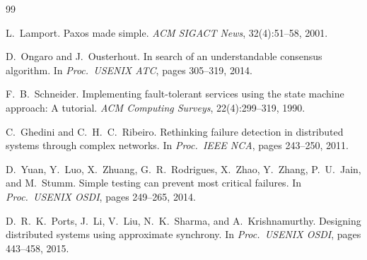 \documentclass[12pt,letterpaper,oneside]{report}
\begin{document}
\begin{thebibliography}{99}

L.\ Lamport.
\newblock Paxos made simple.
\newblock \textit{ACM SIGACT News}, 32(4):51--58, 2001.

D.\ Ongaro and J.\ Ousterhout.
\newblock In search of an understandable consensus algorithm.
\newblock In \textit{Proc.\ USENIX ATC}, pages 305--319, 2014.

F.\ B.\ Schneider.
\newblock Implementing fault-tolerant services using the state machine approach: A tutorial.
\newblock \textit{ACM Computing Surveys}, 22(4):299--319, 1990.

C.\ Ghedini and C.\ H.\ C.\ Ribeiro.
\newblock Rethinking failure detection in distributed systems through complex networks.
\newblock In \textit{Proc.\ IEEE NCA}, pages 243--250, 2011.

D.\ Yuan, Y.\ Luo, X.\ Zhuang, G.\ R.\ Rodrigues, X.\ Zhao, Y.\ Zhang, P.\ U.\ Jain, and M.\ Stumm.
\newblock Simple testing can prevent most critical failures.
\newblock In \textit{Proc.\ USENIX OSDI}, pages 249--265, 2014.

D.\ R.\ K.\ Ports, J.\ Li, V.\ Liu, N.\ K.\ Sharma, and A.\ Krishnamurthy.
\newblock Designing distributed systems using approximate synchrony.
\newblock In \textit{Proc.\ USENIX OSDI}, pages 443--458, 2015.

\end{thebibliography}
\end{document}
